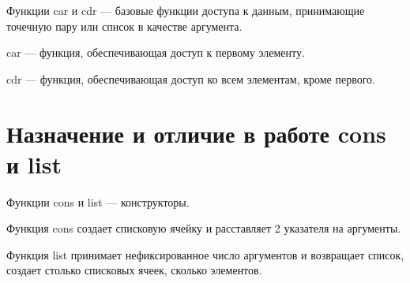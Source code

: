 Функции car и cdr --- базовые функции доступа к данным, принимающие точечную
пару или список в качестве аргумента.

car --- функция, обеспечивающая доступ к первому элементу.

cdr --- функция, обеспечивающая доступ ко всем элементам, кроме первого.

\section{Назначение и отличие в работе cons и list}

Функции cons и list --- конструкторы.

Функция cons создает списковую ячейку и расставляет 2 указателя на
аргументы.

Функция list принимает нефиксированное число аргументов и возвращает список,
создает столько списковых ячеек, сколько элементов.
